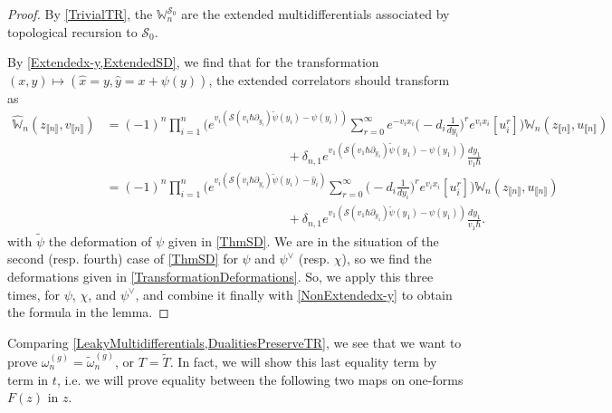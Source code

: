 \documentclass[10pt,a4paper,oneside,no-math,reqno]{amsart}%
\theoremstyle{plain}
\theoremstyle{definition}
\theoremstyle{remark}
\numberwithin{equation}{section}
\newcommand{\mb}[1]{\mathbb{#1}}
\newcommand{\mc}[1]{\mathcal{#1}}
\newcommand{\1}{\mathds{1}}
\newcommand{\<}{\langle}
\renewcommand{\>}{\rangle}
\newcommand{\del}{\partial}
\begin{document}
\begin{proof}
	By \cref{TrivialTR}, the $ \mb{W}^{\mc{S}_0}_n$ are the extended multidifferentials associated by topological recursion to $ \mc{S}_0$.

	By \cref{Extendedx-y,ExtendedSD}, we find that for the transformation $ (x, y) \mapsto (\hat{x} = y, \hat{y} = x + \psi(y))$, the extended correlators should transform as
	\begin{equation}\label{DoubleTransform}
		\begin{split}
			\hat{\mb{W}}_n (z_{\llbracket n\rrbracket}, v_{\llbracket n\rrbracket})
			&=
			(-1)^n \prod_{i=1}^n \bigg(e^{v_i ( \mc{S}(v_i\hbar \del_{y_i}) \tilde{\psi}(y_i) - \psi (y_i) )} \sum_{r=0}^\infty e^{-v_i x_i} \big( -d_i \frac{1}{dy_i} \big)^r e^{v_ix_i} [u_i^r ] \bigg) \mb{W}_n (z_{\llbracket n\rrbracket}, u_{\llbracket n\rrbracket} )
			\\
			&\hspace{6cm}
			+ \delta_{n,1} e^{v_1 ( \mc{S}(v_1\hbar \del_{y_1}) \tilde{\psi}(y_1) - \psi (y_1) )} \frac{dy_1}{v_1\hbar}
			\\
			&=
			(-1)^n \prod_{i=1}^n \bigg(e^{v_i ( \mc{S}(v_i\hbar \del_{y_i}) \tilde{\psi}(y_i) - \hat{y}_i )} \sum_{r=0}^\infty \big( -d_i \frac{1}{dy_i} \big)^r e^{v_ix_i} [u_i^r ] \bigg) \mb{W}_n (z_{\llbracket n\rrbracket}, u_{\llbracket n\rrbracket} ) 
			\\
			&\hspace{6cm}
			+ \delta_{n,1} e^{v_1 ( \mc{S}(v_1\hbar \del_{y_1}) \tilde{\psi}(y_1) - \psi (y_1) )} \frac{dy_1}{v_1\hbar} .
		\end{split}
	\end{equation}
	with $ \tilde{\psi}$ the deformation of $ \psi $ given in \cref{ThmSD}. We are in the situation of the second (resp. fourth) case of \cref{ThmSD} for $ \psi$ and $ \psi^\vee$ (resp. $\chi$), so we find the deformations given in \cref{TransformationDeformations}. So, we apply this three times, for $ \psi$, $ \chi$, and $ \psi^\vee$, and combine it finally with \cref{NonExtendedx-y} to obtain the formula in the lemma.
\end{proof}


Comparing \cref{LeakyMultidifferentials,DualitiesPreserveTR}, we see that we want to prove $ \omega^{(g)}_n = \tilde{\omega}^{(g)}_n$, or $ T = \tilde{T}$. In fact, we will show this last equality term by term in $t$, i.e. we will prove equality between the following two maps on one-forms $F(z)$ in $z$.
\end{document}
